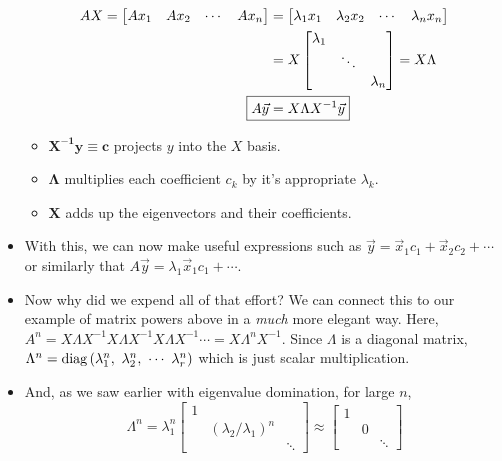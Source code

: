 \documentclass[11pt]{article}
\begin{document}
\begin{itemize}
\begin{align*}
	AX = \begin{bmatrix}
  Ax_{1} & Ax_{2} & \cdots & Ax_{n}
  \end{bmatrix} &= \begin{bmatrix}
  \lambda_{1}x_{1} & \lambda_{2}x_{2} & \cdots & \lambda_{n}x_{n}
\end{bmatrix}\\
&= X \begin{bmatrix}
  \lambda_{1} &  & \\
 & \ddots & \\
 &  & \lambda_{n}
\end{bmatrix}= X \Lambda \\
	\Aboxed{A \vec{y} &= X \Lambda X^{-1} \vec{y}}
\end{align*}
\begin{itemize}
	\item $\bm{X^{-1}}\mathbf{y} \equiv \mathbf{c}$ projects $y$ into the $X$ basis.
	\item $\bm{\Lambda}$ multiplies each coefficient $c_{k}$ by it's appropriate $\lambda_{k}$.
	\item $\bm{X}$ adds up the eigenvectors and their coefficients.
\end{itemize}
\item With this, we can now make useful expressions such as $\vec{y} = \vec{x}_{1}c_{1} + \vec{x}_{2}c_{2}+ \cdots$ or similarly that $A \vec{y} = \lambda_{1}\vec{x}_{1}c_{1} + \cdots$.
\item Now why did we expend all of that effort? We can connect this to our example of matrix powers above in a \textit{much} more elegant way. Here,  $A^{n} = X\Lambda X^{-1}X \Lambda X^{-1}X\Lambda X^{-1}\cdots = \boxed{X\Lambda^{n} X^{-1}}$. Since $\Lambda$ is a diagonal matrix, $\Lambda^{n} = \operatorname{diag} \qty(\lambda_{1}^{n},\ \lambda_{2}^{n}, \ \cdots \ \lambda_{r}^{n})$ which is just scalar multiplication.
\item And, as we saw earlier with eigenvalue domination, for large $n$,
	$$\Lambda^n  = \lambda_{1}^{n}\begin{bmatrix}
	  1 &  & \\
	 & (\lambda_{2}/\lambda_{1})^{n} & \\
	 &  & \ddots
	\end{bmatrix} \approx \begin{bmatrix}
	  1 &  & \\
	 & 0 & \\
	 &  & \ddots
	\end{bmatrix}$$ 

\end{itemize}
\end{document}
